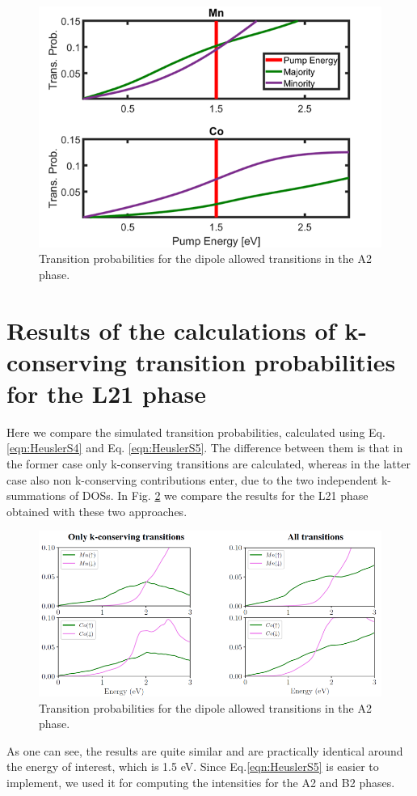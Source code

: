 \begin{figure}[htbp]
	\begin{center}
		\includegraphics[width=120mm]{figs/TransitionProbTotalA2}
	\end{center}
	\caption{Transition probabilities for the dipole allowed transitions in the A2 phase.}
	\label{fig: TransitionProbTotalA2}
\end{figure}

\section{Results of the calculations of k-conserving transition probabilities for the L21 phase}

Here we compare the simulated transition probabilities, calculated using Eq.\ref{eqn:HeuslerS4} and Eq. \ref{eqn:HeuslerS5}. The difference between them is that in the former case only k-conserving transitions are calculated, whereas in the latter case also non k-conserving contributions enter, due to the two independent k-summations of DOSs. In Fig. \ref{fig: kConsComp} we compare the results for the L21 phase obtained with these two approaches.
\begin{figure}[htbp]
	\begin{center}
		\includegraphics[width=120mm]{figs/kConsComp}
	\end{center}
	\caption{Transition probabilities for the dipole allowed transitions in the A2 phase.}
	\label{fig: kConsComp}
\end{figure}
As one can see, the results are quite similar and are practically identical around the energy of interest, which is 1.5 eV. Since Eq.\ref{eqn:HeuslerS5} is easier to implement, we used it for computing the intensities for the A2 and B2 phases. 

